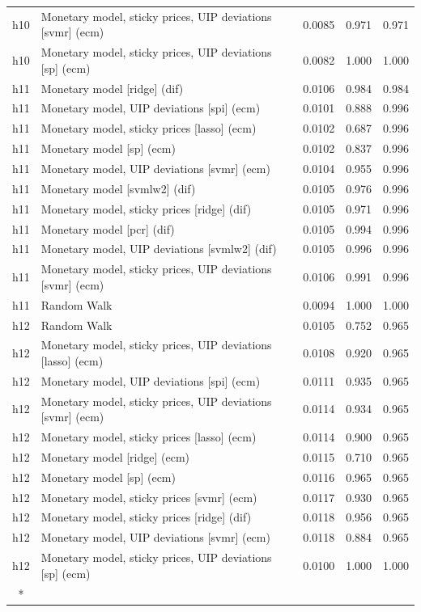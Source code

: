 \begin{ThreePartTable}
\begin{longtable}[t]{cp{5.5cm}ccc}
h10 & \raggedright Monetary model, sticky prices, UIP deviations [svmr] (ecm) & 0.0085 & 0.971 & 0.971\\
h10 & \raggedright Monetary model, sticky prices, UIP deviations [sp] (ecm) & 0.0082 & 1.000 & 1.000\\
\addlinespace
h11 & \raggedright Monetary model [ridge] (dif) & 0.0106 & 0.984 & 0.984\\
h11 & \raggedright Monetary model, UIP deviations [spi] (ecm) & 0.0101 & 0.888 & 0.996\\
h11 & \raggedright Monetary model, sticky prices [lasso] (ecm) & 0.0102 & 0.687 & 0.996\\
h11 & \raggedright Monetary model [sp] (ecm) & 0.0102 & 0.837 & 0.996\\
h11 & \raggedright Monetary model, UIP deviations [svmr] (ecm) & 0.0104 & 0.955 & 0.996\\
h11 & \raggedright Monetary model [svmlw2] (dif) & 0.0105 & 0.976 & 0.996\\
h11 & \raggedright Monetary model, sticky prices [ridge] (dif) & 0.0105 & 0.971 & 0.996\\
h11 & \raggedright Monetary model [pcr] (dif) & 0.0105 & 0.994 & 0.996\\
h11 & \raggedright Monetary model, UIP deviations [svmlw2] (dif) & 0.0105 & 0.996 & 0.996\\
h11 & \raggedright Monetary model, sticky prices, UIP deviations [svmr] (ecm) & 0.0106 & 0.991 & 0.996\\
h11 & \raggedright Random Walk & 0.0094 & 1.000 & 1.000\\
\addlinespace
h12 & \raggedright Random Walk & 0.0105 & 0.752 & 0.965\\
h12 & \raggedright Monetary model, sticky prices, UIP deviations [lasso] (ecm) & 0.0108 & 0.920 & 0.965\\
h12 & \raggedright Monetary model, UIP deviations [spi] (ecm) & 0.0111 & 0.935 & 0.965\\
h12 & \raggedright Monetary model, sticky prices, UIP deviations [svmr] (ecm) & 0.0114 & 0.934 & 0.965\\
h12 & \raggedright Monetary model, sticky prices [lasso] (ecm) & 0.0114 & 0.900 & 0.965\\
h12 & \raggedright Monetary model [ridge] (ecm) & 0.0115 & 0.710 & 0.965\\
h12 & \raggedright Monetary model [sp] (ecm) & 0.0116 & 0.965 & 0.965\\
h12 & \raggedright Monetary model, sticky prices [svmr] (ecm) & 0.0117 & 0.930 & 0.965\\
h12 & \raggedright Monetary model, sticky prices [ridge] (dif) & 0.0118 & 0.956 & 0.965\\
h12 & \raggedright Monetary model, UIP deviations [svmr] (ecm) & 0.0118 & 0.884 & 0.965\\
h12 & \raggedright Monetary model, sticky prices, UIP deviations [sp] (ecm) & 0.0100 & 1.000 & 1.000\\*
\end{longtable}
\end{ThreePartTable}
\endgroup{}
